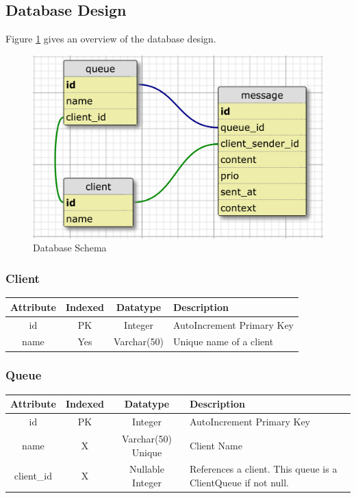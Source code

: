 \documentclass[a4paper]{article}
\begin{document}
\subsection{Database Design}
Figure \ref{fig:dbschema} gives an overview of the database design.


\begin{figure}[H]
	\begin{center}
    \includegraphics[scale=0.3]{../drawings/database-schema.png}
  \end{center}
  \caption{Database Schema}
  \label{fig:dbschema}
\end{figure}



\subsubsection{Client}
\begin{tabular}{|c|c|c|l|}
\hline 
\textbf{Attribute} & \textbf{Indexed} & \textbf{Datatype} & \textbf{Description} \\ 
\hline 
id & PK & Integer & AutoIncrement Primary Key \\ 
\hline 
name & Yes & Varchar(50) & Unique name of a client \\ 
\hline 
\end{tabular} 


\subsubsection{Queue}
\begin{tabular}{|c|c|c|l|}
\hline 
\textbf{Attribute} & \textbf{Indexed} & \textbf{Datatype} & \textbf{Description} \\ 
\hline 
id & PK & Integer & AutoIncrement Primary Key \\ 
\hline 
name & X & Varchar(50) Unique & Client Name \\ 
\hline 
client\_id & X & Nullable Integer & References a client. This queue is a ClientQueue if not null. \\ 
\hline 
\end{tabular} 
\end{document}
